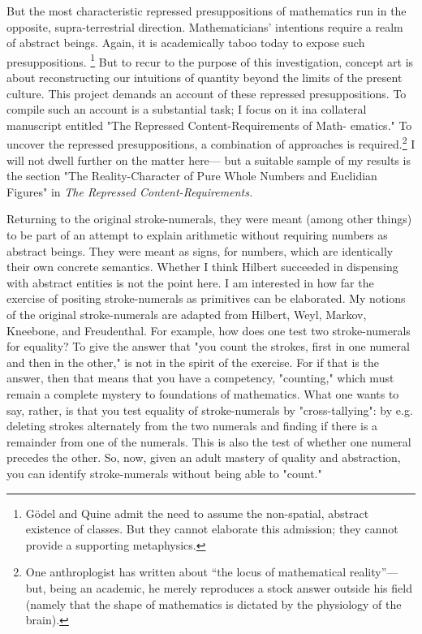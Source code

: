 But the most characteristic repressed presuppositions of mathematics 
run in the opposite, supra-terrestrial direction. Mathematicians' 
intentions require a realm of abstract beings. Again, it is academically 
taboo today to expose such presuppositions.
\footnote{G\"{o}del and Quine admit the need to assume the non-spatial, abstract 
existence of classes. But they cannot elaborate this admission; they cannot 
provide a supporting metaphysics.} But to recur to the 
purpose of this investigation, concept art is about reconstructing our 
intuitions of quantity beyond the limits of the present culture. This 
project demands an account of these repressed presuppositions. To 
compile such an account is a substantial task; I focus on it ina collateral 
manuscript entitled "The Repressed Content-Requirements of Math- 
ematics." To uncover the repressed presuppositions, a combination of 
approaches is required.\footnote{One anthroplogist has written about \enquote{the locus of 
mathematical reality}---but, being an academic, he merely reproduces a stock answer outside 
his field (namely that the shape of mathematics is dictated by the physiology of 
the brain).} I will not dwell further on the matter here---
but a suitable sample of my results is the section "The Reality-Character 
of Pure Whole Numbers and Euclidian Figures" in \emph{The Repressed Content-Requirements.}

Returning to the original stroke-numerals, they were meant 
(among other things) to be part of an attempt to explain arithmetic 
without requiring numbers as abstract beings. They were meant as 
signs, for numbers, which are identically their own concrete semantics. 
Whether I think Hilbert succeeded in dispensing with abstract entities is 
not the point here. I am interested in how far the exercise of positing 
stroke-numerals as primitives can be elaborated. My notions of the 
original stroke-numerals are adapted from Hilbert, Weyl, Markov, 
Kneebone, and Freudenthal. For example, how does one test two 
stroke-numerals for equality? To give the answer that "you count the 
strokes, first in one numeral and then in the other," is not in the spirit of 
the exercise. For if that is the answer, then that means that you have a 
competency, "counting," which must remain a complete mystery to 
foundations of mathematics. What one wants to say, rather, is that you 
test equality of stroke-numerals by "cross-tallying": by e.g. deleting 
strokes alternately from the two numerals and finding if there is a 
remainder from one of the numerals. This is also the test of whether one 
numeral precedes the other. So, now, given an adult mastery of quality 
and abstraction, you can identify stroke-numerals without being able 
to "count." 

